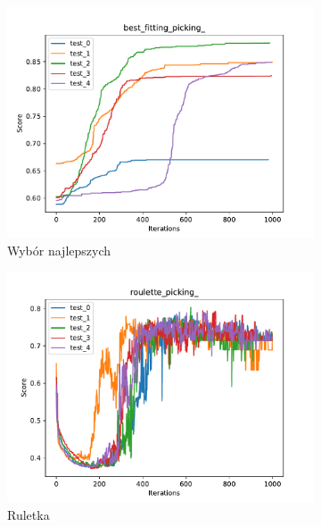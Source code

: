 \begin{figure}[H]
    \centering 
    \begin{subfigure}[b]{0.49\linewidth}
        \includegraphics[width=\linewidth]{img/best_fitting_picking_.pdf}
        \caption{Wybór najlepszych}
    \end{subfigure}
    \begin{subfigure}[b]{0.49\linewidth}
        \includegraphics[width=\linewidth]{img/roulette_picking_.pdf}
        \caption{Ruletka}
    \end{subfigure}
    \begin{subfigure}[b]{0.49\linewidth}

\end{subfigure}
\end{figure}
